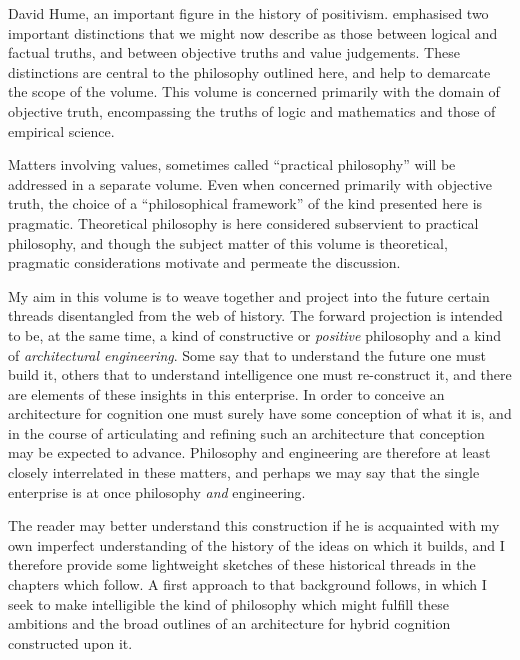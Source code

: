{David Hume, an important figure in the history of positivism. emphasised two important distinctions that we might now describe as those between logical and factual truths, and between objective truths and value judgements.
These distinctions are central to the philosophy outlined here, and help to demarcate the scope of the volume.
This volume is concerned primarily with the domain of objective truth, encompassing the truths of logic and mathematics and those of empirical science.

Matters involving values, sometimes called ``practical philosophy'' will be addressed in a separate volume.
Even when concerned primarily with objective truth, the choice of a ``philosophical framework'' of the kind presented here is pragmatic.
Theoretical philosophy is here considered subservient to practical philosophy, and though the subject matter of this volume is theoretical, pragmatic considerations motivate and permeate the discussion.
}%


My aim in this volume is to weave together and project into the future certain threads disentangled from the web of history.
The forward projection is intended to be, at the same time, a kind of constructive or {\it positive} philosophy and a kind of {\it architectural engineering}.
Some say that to understand the future one must build it, others that to understand intelligence one must re-construct it, and there are elements of these insights in this enterprise.
In order to conceive an architecture for cognition one must surely have some conception of what it is, and in the course of articulating and refining such an architecture that conception may be expected to advance.
Philosophy and engineering are therefore at least closely interrelated in these matters, and perhaps we may say that the single enterprise is at once philosophy {\it and} engineering.

The reader may better understand this construction if he is acquainted with my own imperfect understanding of the history of the ideas on which it builds, and I therefore provide some lightweight sketches of these historical threads in the chapters which follow.
A first approach to that background follows, in which I seek to make intelligible the kind of philosophy which might fulfill these ambitions and the broad outlines of an architecture for hybrid cognition constructed upon it.


